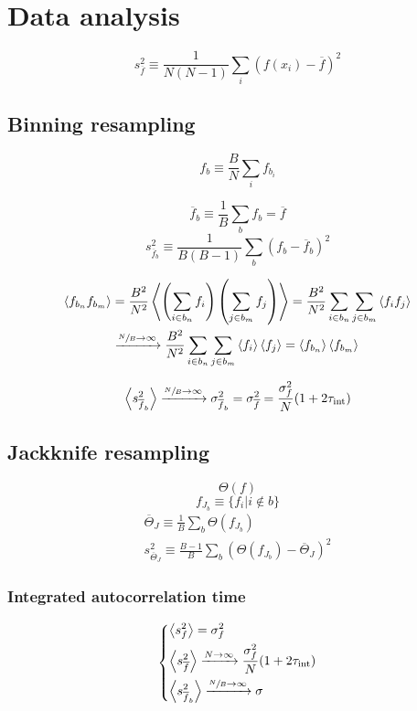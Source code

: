 \chapter{Data analysis}\label{ap:data}

\[
    s_{\overline f}^2 \equiv \frac{1}{N(N-1)}\sum_i\left(f(x_i)-\overline f\right)^2
\]

\section{Binning resampling}

\[
    f_b \equiv \frac{B}{N}\sum_i f_{b_i}
\]

\[
    \overline f_b \equiv \frac{1}{B} \sum_b f_b = \overline f
\]
\[
    s_{\overline f_b}^2 \equiv \frac{1}{B(B-1)}\sum_b \left(f_b - \overline f_b\right)^2
\]

\[\begin{aligned}
    \left<f_{b_n}f_{b_m}\right> &= \frac{B^2}{N^2}\left<\left(\sum_{i\in b_n} f_i\right)\left(\sum_{j\in b_m}f_j\right)\right> 
                                = \frac{B^2}{N^2}\sum_{i\in b_n} \sum_{j\in b_m} \left<f_i f_j\right> \\
                                &\xrightarrow{\sfrac{N}{B}\to\infty} \frac{B^2}{N^2}\sum_{i\in b_n} \sum_{j\in b_m} \left<f_i\right> \left<f_j\right> 
                                = \left<f_{b_n}\right>\left<f_{b_m}\right>
\end{aligned}\]

\[
    \left<s_{\overline f_b}^2\right> \xrightarrow{\sfrac{N}{B}\to\infty} \sigma_{\overline f_b}^2 = \sigma_{\overline f}^2 = \frac{\sigma_f^2}{N}(1+2\tau_\mathrm{int})
\]


\section{Jackknife resampling} 
\[
    \Theta(f)
\]
\[
    f_{J_b} \equiv \{f_i | i\notin b\}
\]
\[\begin{gathered}
    \overline \Theta_J \equiv \frac{1}{B} \sum_b \Theta(f_{J_b}) \\
    s_{\overline \Theta_J}^2 \equiv \frac{B-1}{B}\sum_b \left(\Theta(f_{J_b})-\overline\Theta_J\right)^2
\end{gathered}\]

\subsection*{Integrated autocorrelation time}
\[\begin{dcases}
    \left<s_f^2\right> = \sigma_f^2 \\
    \left<s_{\overline f}^2\right> \xrightarrow{N\to\infty} \frac{\sigma_f^2}{N}(1+2\tau_\mathrm{int}) \\
    \left<s_{\overline f_b}^2\right> \xrightarrow{\sfrac{N}{B}\to\infty} \sigma 
\end{dcases}\]


